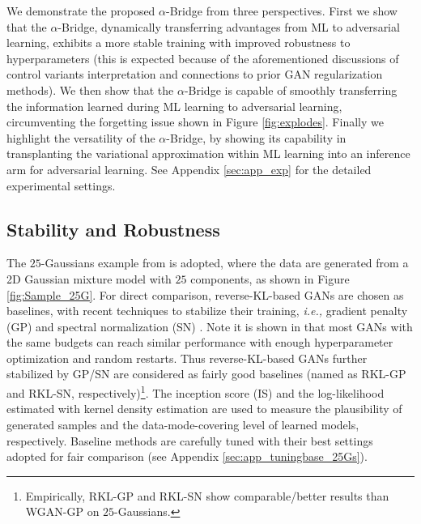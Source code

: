\documentclass[letterpaper]{article} %
\newcommand{\ie}[0]{\emph{i.e., }}
\begin{document}
We demonstrate the proposed $\alpha$-Bridge from three perspectives. 
First we show that the $\alpha$-Bridge, dynamically transferring advantages from ML to adversarial learning, exhibits a more stable training with improved robustness to hyperparameters (this is expected because of the aforementioned discussions of control variants interpretation and connections to prior GAN regularization methods).
We then show that the $\alpha$-Bridge is capable of smoothly transferring the information learned during ML learning to adversarial learning, circumventing the forgetting issue shown in Figure \ref{fig:explodes}.
Finally we highlight the versatility of the $\alpha$-Bridge, by showing its capability in transplanting the variational approximation within ML learning into an inference arm for adversarial learning. See 
Appendix \ref{sec:app_exp} 
for the detailed experimental settings. 


\subsection{Stability and Robustness}
\label{sec:exp_25Gaussian}


The $25$-Gaussians example from \cite{tao2018chi} is adopted, where the data are generated from a 2D Gaussian mixture model with $25$ components, as shown in Figure \ref{fig:Sample_25G}. For direct comparison, reverse-KL-based GANs are chosen as baselines, with recent techniques to stabilize their training, \ie gradient penalty (GP) \cite{mescheder2018training} and spectral normalization (SN) \cite{miyato2018spectral}. Note it is shown in \cite{GoogleCompareGAN} that most GANs with the same budgets can reach similar performance with enough hyperparameter optimization and random restarts. Thus reverse-KL-based GANs further stabilized by GP/SN are considered as fairly good baselines (named as RKL-GP and RKL-SN, respectively)\footnote{Empirically, RKL-GP and RKL-SN show comparable/better results than WGAN-GP \cite{gulrajani2017improved} on $25$-Gaussians.}.
The inception score (IS) \cite{salimans2016improved} and the log-likelihood estimated with kernel density estimation \cite{parzen1962estimation} are used to measure the plausibility of generated samples and the data-mode-covering level of learned models, respectively.
Baseline methods are carefully tuned with their best settings adopted for fair comparison (see 
Appendix \ref{sec:app_tuningbase_25Gs}).
\end{document}
